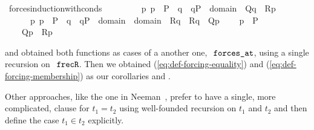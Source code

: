 \begin{isabelle}
\isamarkupfalse%
\ forces{\isacharunderscore}induction{\isacharunderscore}with{\isacharunderscore}conds{\isacharcolon}\isanewline
\ \ \isanewline
\ \ \ \ {\isachardoublequoteopen}{\isasymAnd}{\isasymtau}\ {\isasymtheta}\ p{\isachardot}\ p\ {\isasymin}\ P\ {\isasymLongrightarrow}\ {\isasymlbrakk}{\isasymAnd}q\ {\isasymsigma}{\isachardot}\ {\isasymlbrakk}q{\isasymin}P\ {\isacharsemicolon}\ {\isasymsigma}{\isasymin}domain{\isacharparenleft}{\isasymtheta}{\isacharparenright}{\isasymrbrakk}\ {\isasymLongrightarrow}\ Q{\isacharparenleft}q{\isacharcomma}{\isasymtau}{\isacharcomma}{\isasymsigma}{\isacharparenright}{\isasymrbrakk}\ {\isasymLongrightarrow}\ R{\isacharparenleft}p{\isacharcomma}{\isasymtau}{\isacharcomma}{\isasymtheta}{\isacharparenright}{\isachardoublequoteclose}\isanewline
\ \ \ \ {\isachardoublequoteopen}{\isasymAnd}{\isasymtau}\ {\isasymtheta}\ p{\isachardot}\ p\ {\isasymin}\ P\ {\isasymLongrightarrow}\ {\isasymlbrakk}{\isasymAnd}q\ {\isasymsigma}{\isachardot}\ {\isasymlbrakk}q{\isasymin}P\ {\isacharsemicolon}\ {\isasymsigma}{\isasymin}domain{\isacharparenleft}{\isasymtau}{\isacharparenright}\ {\isasymunion}\ domain{\isacharparenleft}{\isasymtheta}{\isacharparenright}{\isasymrbrakk}\ {\isasymLongrightarrow}\ R{\isacharparenleft}q{\isacharcomma}{\isasymsigma}{\isacharcomma}{\isasymtau}{\isacharparenright}\ {\isasymand}\ R{\isacharparenleft}q{\isacharcomma}{\isasymsigma}{\isacharcomma}{\isasymtheta}{\isacharparenright}{\isasymrbrakk}\ {\isasymLongrightarrow}\ Q{\isacharparenleft}p{\isacharcomma}{\isasymtau}{\isacharcomma}{\isasymtheta}{\isacharparenright}{\isachardoublequoteclose}\isanewline
\ \ \ \ {\isachardoublequoteopen}p\ {\isasymin}\ P{\isachardoublequoteclose}\isanewline
\ \ \isanewline
\ \ \ \ {\isachardoublequoteopen}Q{\isacharparenleft}p{\isacharcomma}{\isasymtau}{\isacharcomma}{\isasymtheta}{\isacharparenright}\ {\isasymand}\ R{\isacharparenleft}p{\isacharcomma}{\isasymtau}{\isacharcomma}{\isasymtheta}{\isacharparenright}{\isachardoublequoteclose}
\end{isabelle}
%
and 
obtained both functions as cases of a another one, 
$\forcesat$, using a single recursion on $\frecR$. Then we obtained 
(\ref{eq:def-forcing-equality}) and (\ref{eq:def-forcing-membership})
as our corollaries  and
.

Other approaches, like the one in Neeman~\cite{neeman-course}, prefer
to have a single, more complicated, clause for $t_1=t_2$ using
well-founded recursion on $t_1$
and $t_2$ and then define the case $t_1\in t_2$ explicitly. 




